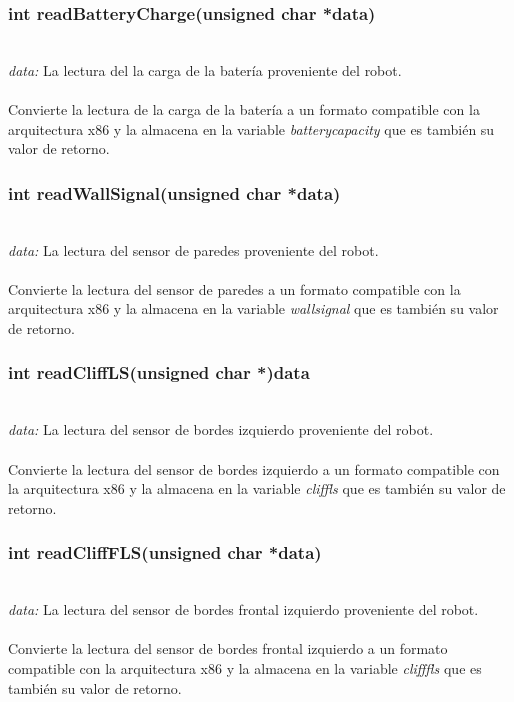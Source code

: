\documentclass[letterpaper]{book}
\begin{document}
\subsubsection{int readBatteryCharge(unsigned char *data)}\mbox{}\\
\emph{data: }La lectura del la carga de la batería proveniente del robot.\\\\
Convierte la lectura de la carga de la batería a un formato compatible con la arquitectura x86 y la almacena en la variable \emph{batterycapacity} que es también su valor de retorno.\\ 

\subsubsection{int readWallSignal(unsigned char *data)}\mbox{}\\
\emph{data: }La lectura del sensor de paredes proveniente del robot.\\\\
Convierte la lectura del sensor de paredes a un formato compatible con la arquitectura x86 y la almacena en la variable \emph{wallsignal} que es también su valor de retorno.\\ 

\subsubsection{int readCliffLS(unsigned char *)data}\mbox{}\\
\emph{data: }La lectura del sensor de bordes izquierdo proveniente del robot.\\\\
Convierte la lectura del sensor de bordes izquierdo a un formato compatible con la arquitectura x86 y la almacena en la variable \emph{cliffls} que es también su valor de retorno.\\ 

\subsubsection{int readCliffFLS(unsigned char *data)}\mbox{}\\
\emph{data: }La lectura del sensor de bordes frontal izquierdo proveniente del robot.\\\\
Convierte la lectura del sensor de bordes frontal izquierdo a un formato compatible con la arquitectura x86 y la almacena en la variable \emph{clifffls} que es también su valor de retorno.\\ 
\end{document}
